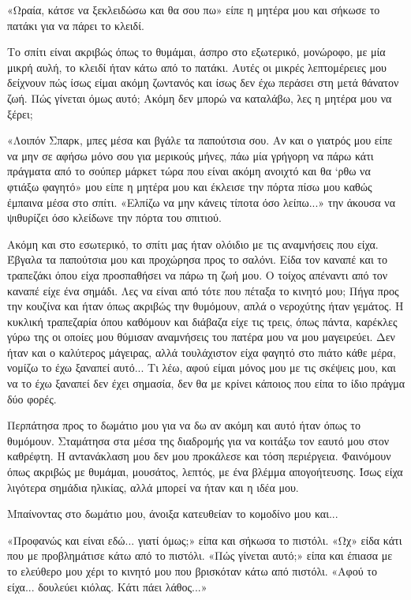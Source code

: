 \documentclass[12pt,twoside, openany]{book}
\begin{document}
«Ωραία, κάτσε να ξεκλειδώσω και θα σου πω» είπε η μητέρα μου και σήκωσε το πατάκι για να πάρει το κλειδί. 

Το σπίτι είναι ακριβώς όπως το θυμάμαι, άσπρο στο εξωτερικό, μονώροφο, με μία μικρή αυλή, το κλειδί ήταν κάτω από το πατάκι. Αυτές οι μικρές λεπτομέρειες μου δείχνουν πώς ίσως είμαι ακόμη ζωντανός και ίσως δεν έχω περάσει στη μετά θάνατον ζωή. Πώς γίνεται όμως αυτό; Ακόμη δεν μπορώ να καταλάβω, λες η μητέρα μου να ξέρει;

«Λοιπόν Σπαρκ, μπες μέσα και βγάλε τα παπούτσια σου. Αν και ο γιατρός μου είπε να μην σε αφήσω μόνο σου για μερικούς μήνες, πάω μία γρήγορη να πάρω κάτι πράγματα από το σούπερ μάρκετ τώρα που είναι ακόμη ανοιχτό και θα ‘ρθω να φτιάξω φαγητό» μου είπε η μητέρα μου και έκλεισε την πόρτα πίσω μου καθώς έμπαινα μέσα στο σπίτι. «Ελπίζω να μην κάνεις τίποτα όσο λείπω...» την άκουσα να ψιθυρίζει όσο κλείδωνε την πόρτα του σπιτιού.

Ακόμη και στο εσωτερικό, το σπίτι μας ήταν ολόιδιο με τις αναμνήσεις που είχα. Έβγαλα τα παπούτσια μου και προχώρησα προς το σαλόνι. Είδα τον καναπέ και το τραπεζάκι όπου είχα προσπαθήσει να πάρω τη ζωή μου. Ο τοίχος απέναντι από τον καναπέ είχε ένα σημάδι. Λες να είναι από τότε που πέταξα το κινητό μου; Πήγα προς την κουζίνα και ήταν όπως ακριβώς την θυμόμουν, απλά ο νεροχύτης ήταν γεμάτος. Η κυκλική τραπεζαρία όπου καθόμουν και διάβαζα είχε τις τρεις, όπως πάντα, καρέκλες γύρω της οι οποίες μου θύμισαν αναμνήσεις του πατέρα μου να μου μαγειρεύει. Δεν ήταν και ο καλύτερος μάγειρας, αλλά τουλάχιστον είχα φαγητό στο πιάτο κάθε μέρα, νομίζω το έχω ξαναπεί αυτό... Τι λέω, αφού είμαι μόνος μου με τις σκέψεις μου, και να το έχω ξαναπεί δεν έχει σημασία, δεν θα με κρίνει κάποιος που είπα το ίδιο πράγμα δύο φορές.

Περπάτησα προς το δωμάτιο μου για να δω αν ακόμη και αυτό ήταν όπως το θυμόμουν. Σταμάτησα στα μέσα της διαδρομής για να κοιτάξω τον εαυτό μου στον καθρέφτη. Η αντανάκλαση μου δεν μου προκάλεσε και τόση περιέργεια. Φαινόμουν όπως ακριβώς με θυμάμαι, μουσάτος, λεπτός, με ένα βλέμμα απογοήτευσης. Ίσως είχα λιγότερα σημάδια ηλικίας, αλλά μπορεί να ήταν και η ιδέα μου.

Μπαίνοντας στο δωμάτιο μου, άνοιξα κατευθείαν το κομοδίνο μου και...

«Προφανώς και είναι εδώ... γιατί όμως;» είπα και σήκωσα το πιστόλι. «Ωχ» είδα κάτι που με προβλημάτισε κάτω από το πιστόλι. «Πώς γίνεται αυτό;» είπα και έπιασα με το ελεύθερο μου χέρι το κινητό μου που βρισκόταν κάτω από	πιστόλι. «Αφού το είχα... δουλεύει κιόλας. Κάτι πάει λάθος...»
\end{document}
